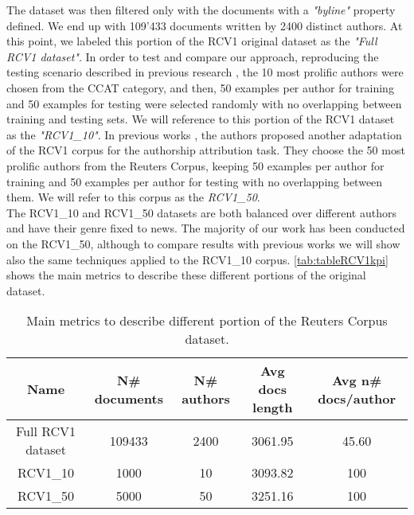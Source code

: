 The dataset was then filtered only with the documents with a \textit{"byline"} property defined. We end up with 109'433 documents written by 2400 distinct authors. At this point, we labeled this portion of the RCV1 original dataset as the \textit{"Full RCV1 dataset"}.
In order to test and compare our approach, reproducing the testing scenario
described in previous research \cite{stamatatos2009survey}, the 10 most prolific authors were chosen from the CCAT category, and then, 50 examples per author for training and 50 examples for testing were selected randomly with no overlapping between training and testing sets. We will reference to this portion of the RCV1 dataset as the \textit{"RCV1\_10"}.
In previous works \cite{houvardas2006n}, the authors proposed another adaptation of the RCV1 corpus for the authorship attribution task. They choose the 50 most prolific authors from the Reuters Corpus, keeping 50 examples per author for training and 50 examples per author for testing with no
overlapping between them. We will refer to this corpus as the \textit{RCV1\_50}.\\
The RCV1\_10 and RCV1\_50 datasets are both balanced over different authors and have their genre fixed to news.
The majority of our work has been conducted on the RCV1\_50, although to compare results with previous works we will show also the same techniques applied to the RCV1\_10 corpus.
\autoref{tab:tableRCV1kpi} shows the main metrics to describe these different portions of the original dataset.

\begin{table}[h!]
	\begin{center}  
		\caption[Reuters Corpus metrics]{Main metrics to describe different portion of the Reuters Corpus dataset.} 
		\label{tab:tableRCV1kpi}
		\begin{tabular}{|c | c | c | c | c |}
			\hline 
			Name & N\# documents & N\# authors & Avg docs length & Avg n\# docs/author \\
			\hline
			Full RCV1 dataset & 109433 & 2400 & 3061.95 & 45.60 \\ \hline
			RCV1\_10 & 1000 & 10 & 3093.82 & 100  \\ \hline
			RCV1\_50 & 5000 & 50 & 3251.16 & 100  \\ \hline
		\end{tabular} 
	\end{center}
\end{table}

